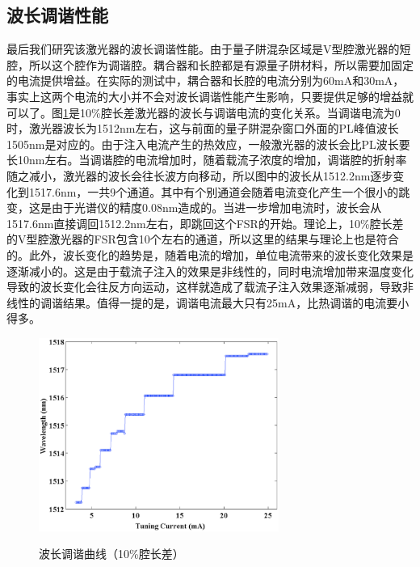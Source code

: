\documentclass{ZJUthesis}
\begin{document}
\subsection{波长调谐性能}

最后我们研究该激光器的波长调谐性能。由于量子阱混杂区域是V型腔激光器的短腔，所以这个腔作为调谐腔。耦合器和长腔都是有源量子阱材料，所以需要加固定的电流提供增益。在实际的测试中，耦合器和长腔的电流分别为60mA和30mA，事实上这两个电流的大小并不会对波长调谐性能产生影响，只要提供足够的增益就可以了。图\ref{fig_single_tuning_p10}是10\%腔长差激光器的波长与调谐电流的变化关系。当调谐电流为0时，激光器波长为1512nm左右，这与前面的量子阱混杂窗口外面的PL峰值波长1505nm是对应的。由于注入电流产生的热效应，一般激光器的波长会比PL波长要长10nm左右。当调谐腔的电流增加时，随着载流子浓度的增加，调谐腔的折射率随之减小，激光器的波长会往长波方向移动，所以图中的波长从1512.2nm逐步变化到1517.6nm，一共9个通道。其中有个别通道会随着电流变化产生一个很小的跳变，这是由于光谱仪的精度0.08nm造成的。当进一步增加电流时，波长会从1517.6nm直接调回1512.2nm左右，即跳回这个FSR的开始。理论上，10\%腔长差的V型腔激光器的FSR包含10个左右的通道，所以这里的结果与理论上也是符合的。此外，波长变化的趋势是，随着电流的增加，单位电流带来的波长变化效果是逐渐减小的。这是由于载流子注入的效果是非线性的，同时电流增加带来温度变化导致的波长变化会往反方向运动，这样就造成了载流子注入效果逐渐减弱，导致非线性的调谐结果。值得一提的是，调谐电流最大只有25mA，比热调谐的电流要小得多。

\begin{figure}[!ht]
  \centering
  \includegraphics[width=0.7\textwidth]{./Pictures/single_tuning_p10.eps}\\
  \caption{波长调谐曲线（10\%腔长差）}
  \label{fig_single_tuning_p10}
\end{figure}
\end{document}
